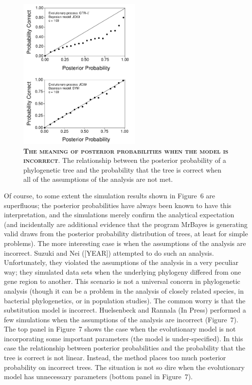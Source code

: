 \documentclass{svmult}
\begin{document}
\begin{figure}[t]
\centering
\includegraphics[height=3in]{fig7}
\caption{\textbf{\textsc{The meaning of posterior probabilities when the model is incorrect}}.  The
relationship between the posterior probability of a phylogenetic tree and the probability that
the tree is correct when all of the assumptions of the analysis are not met. }
\label{fig7}
\end{figure}

Of course, to some extent the simulation results shown in Figure~6 are superfluous; the posterior
probabilities have always been known to have this interpretation, and the simulations merely
confirm the analytical expectation (and incidentally are additional evidence that the program
MrBayes is generating valid draws from the posterior probability distribution of trees, at least
for simple problems). The more interesting case is when the assumptions of the analysis are
incorrect.  Suzuki and Nei ([YEAR]) attempted to do such an analysis. Unfortunately, they violated
the assumptions of the analysis in a very peculiar way; they simulated data sets when the
underlying phylogeny differed from one gene region to another. This scenario is not a universal
concern in phylogenetic analysis (though it can be a problem in the analysis of closely related
species, in bacterial phylogenetics, or in population studies). The common worry is that the
substitution model is incorrect. Huelsenbeck and Rannala (In Press) performed a few simulations
when the assumptions of the analysis are incorrect (Figure~7).  The top panel in Figure~7 shows the
case when the evolutionary model is not incorporating some important parameters (the model is
under-specified). In this case the relationship between posterior probabilities and the probability
that the tree is correct is not linear. Instead, the method places too much posterior probability
on incorrect trees. The situation is not so dire when the evolutionary model has unnecessary
parameters (bottom panel in Figure~7).
\end{document}

